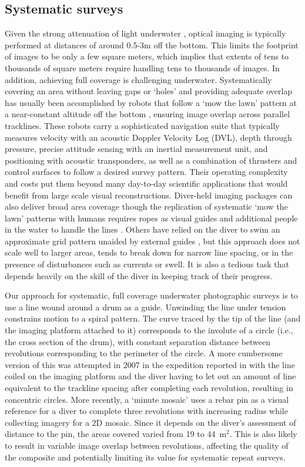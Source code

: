 \subsection{Systematic surveys}
Given the strong attenuation of light underwater \cite{Duntley_1963}, optical imaging is typically performed at distances of around 0.5-3m off the bottom. This limits the footprint of images to be only a few square meters, which implies that extents of tens to thousands of square meters require handling tens to thousands of images. In addition, achieving full coverage is challenging underwater. Systematically covering an area without leaving gaps or `holes' and providing adequate overlap has usually been accomplished by robots that follow a `mow the lawn' pattern at a near-constant altitude off the bottom \cite{Bingham_2010}\cite{Williams_2010}, ensuring image overlap across parallel tracklines. These robots carry a sophisticated navigation suite that typically measures velocity with an acoustic Doppler Velocity Log (DVL), depth through pressure, precise attitude sensing with an inertial measurement unit, and positioning with acoustic transponders, as well as a combination of thrusters and control surfaces to follow a desired survey pattern. Their operating complexity and costs put them beyond many day-to-day scientific applications that would benefit from large scale visual reconstructions.
Diver-held imaging packages can also deliver broad area coverage though the replication of systematic `mow the lawn' patterns with humans requires ropes as visual guides and additional people in the water to handle the lines \cite{Henderson_2013}. Others have relied on the diver to swim an approximate grid pattern unaided by external guides \cite{Burns_2015}, but this approach does not scale well to larger areas, tends to break down for narrow line spacing, or in the presence of disturbances such as currents or swell. It is also a tedious task that depends heavily on the skill of the diver in keeping track of their progress.

Our approach for systematic, full coverage underwater photographic surveys is to use a line wound around a drum as a guide. Unwinding the line under tension constrains motion to a spiral pattern. The curve traced by the tip of the line (and the imaging platform attached to it) corresponds to the involute of a circle (i.e., the cross section of the drum), with constant separation distance between revolutions corresponding to the perimeter of the circle. A more cumbersome version of this was attempted in 2007 in the expedition reported in \cite{Camilli_2007} with the line coiled on the imaging platform and the diver having to let out an amount of line equivalent to the trackline spacing after completing each revolution, resulting in concentric circles. More recently, a `minute mosaic' \cite{gintert2012third} uses a rebar pin as a visual reference for a diver to complete three revolutions with increasing radius while collecting imagery for a 2D mosaic. Since it depends on the diver's assessment of distance to the pin, the areas covered varied from 19 to 44~m$^{2}$. This is also likely to result in variable image overlap between revolutions, affecting the quality of the composite and potentially limiting its value for systematic repeat surveys.


